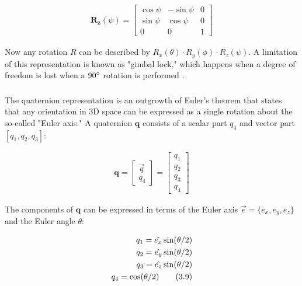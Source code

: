 \documentclass{article}
\begin{document}
\begin{align}
    \mathbf{R_z}(\psi) = \begin{bmatrix}
        \cos \psi & -\sin \psi & 0 \\
        \sin \psi & \cos \psi & 0 \\
        0 & 0 & 1
    \end{bmatrix} \tag{3.7}
\end{align}

Now any rotation $R$ can be described by $R_x(\theta) \cdot R_y(\phi) \cdot R_z(\psi)$. A limitation of this representation is known as "gimbal lock," which happens when a degree of freedom is lost when a $90 \degree$ rotation is performed \cite{diebel}.

\subsubsection{\color{black}{Quaternion Representation}}

The quaternion representation is an outgrowth of Euler's theorem that states that any orientation in 3D space can be expressed as a single rotation about the so-called "Euler axis." A quaternion $\mathbf{q}$ consists of a scalar part $q_{4}$ and vector part $\left[ q_{1}, q_{2}, q_{3} \right]$:

\begin{align}
    \mathbf{q} = \begin{bmatrix}
    \Vec{q} \\
    q_{4}
\end{bmatrix} = \begin{bmatrix}
    q_{1} \\
    q_{2} \\
    q_{3} \\
    q_{4}
\end{bmatrix} \tag{3.8}
\end{align}

\noindent The components of $\mathbf{q}$ can be expressed in terms of the Euler axis $ \Vec{e} = \{e_{x}, e_{y}, e_{z}\}$ and the Euler angle $\theta$:

\begin{align}
    q_{1} = \hat{e_{x}} \sin (\theta /2) \notag \\
    q_{2} = \hat{e_{y}} \sin (\theta /2) \notag \\
    q_{3} = \hat{e_{z}} \sin (\theta /2) \notag \\
    q_{4} = \cos (\theta /2) \tag{3.9} \\ \notag
\end{align}
\end{document}

